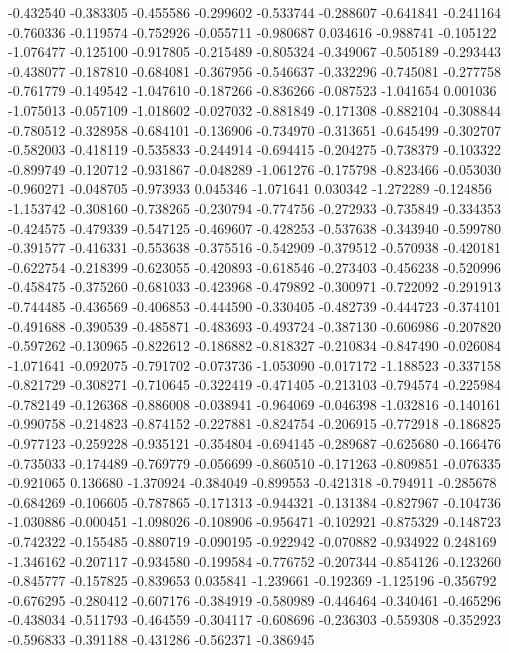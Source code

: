 -0.432540
-0.383305
-0.455586
-0.299602
-0.533744
-0.288607
-0.641841
-0.241164
-0.760336
-0.119574
-0.752926
-0.055711
-0.980687
0.034616
-0.988741
-0.105122
-1.076477
-0.125100
-0.917805
-0.215489
-0.805324
-0.349067
-0.505189
-0.293443
-0.438077
-0.187810
-0.684081
-0.367956
-0.546637
-0.332296
-0.745081
-0.277758
-0.761779
-0.149542
-1.047610
-0.187266
-0.836266
-0.087523
-1.041654
0.001036
-1.075013
-0.057109
-1.018602
-0.027032
-0.881849
-0.171308
-0.882104
-0.308844
-0.780512
-0.328958
-0.684101
-0.136906
-0.734970
-0.313651
-0.645499
-0.302707
-0.582003
-0.418119
-0.535833
-0.244914
-0.694415
-0.204275
-0.738379
-0.103322
-0.899749
-0.120712
-0.931867
-0.048289
-1.061276
-0.175798
-0.823466
-0.053030
-0.960271
-0.048705
-0.973933
0.045346
-1.071641
0.030342
-1.272289
-0.124856
-1.153742
-0.308160
-0.738265
-0.230794
-0.774756
-0.272933
-0.735849
-0.334353
-0.424575
-0.479339
-0.547125
-0.469607
-0.428253
-0.537638
-0.343940
-0.599780
-0.391577
-0.416331
-0.553638
-0.375516
-0.542909
-0.379512
-0.570938
-0.420181
-0.622754
-0.218399
-0.623055
-0.420893
-0.618546
-0.273403
-0.456238
-0.520996
-0.458475
-0.375260
-0.681033
-0.423968
-0.479892
-0.300971
-0.722092
-0.291913
-0.744485
-0.436569
-0.406853
-0.444590
-0.330405
-0.482739
-0.444723
-0.374101
-0.491688
-0.390539
-0.485871
-0.483693
-0.493724
-0.387130
-0.606986
-0.207820
-0.597262
-0.130965
-0.822612
-0.186882
-0.818327
-0.210834
-0.847490
-0.026084
-1.071641
-0.092075
-0.791702
-0.073736
-1.053090
-0.017172
-1.188523
-0.337158
-0.821729
-0.308271
-0.710645
-0.322419
-0.471405
-0.213103
-0.794574
-0.225984
-0.782149
-0.126368
-0.886008
-0.038941
-0.964069
-0.046398
-1.032816
-0.140161
-0.990758
-0.214823
-0.874152
-0.227881
-0.824754
-0.206915
-0.772918
-0.186825
-0.977123
-0.259228
-0.935121
-0.354804
-0.694145
-0.289687
-0.625680
-0.166476
-0.735033
-0.174489
-0.769779
-0.056699
-0.860510
-0.171263
-0.809851
-0.076335
-0.921065
0.136680
-1.370924
-0.384049
-0.899553
-0.421318
-0.794911
-0.285678
-0.684269
-0.106605
-0.787865
-0.171313
-0.944321
-0.131384
-0.827967
-0.104736
-1.030886
-0.000451
-1.098026
-0.108906
-0.956471
-0.102921
-0.875329
-0.148723
-0.742322
-0.155485
-0.880719
-0.090195
-0.922942
-0.070882
-0.934922
0.248169
-1.346162
-0.207117
-0.934580
-0.199584
-0.776752
-0.207344
-0.854126
-0.123260
-0.845777
-0.157825
-0.839653
0.035841
-1.239661
-0.192369
-1.125196
-0.356792
-0.676295
-0.280412
-0.607176
-0.384919
-0.580989
-0.446464
-0.340461
-0.465296
-0.438034
-0.511793
-0.464559
-0.304117
-0.608696
-0.236303
-0.559308
-0.352923
-0.596833
-0.391188
-0.431286
-0.562371
-0.386945
